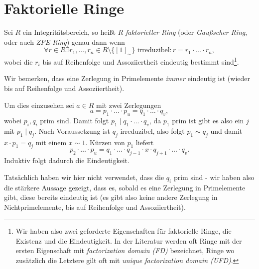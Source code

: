 
\section{Faktorielle Ringe}

\begin{definition}
    Sei $R$ ein Integritätsbereich, so heißt $R$ \emph{faktorieller Ring} (oder \emph{Gaußscher Ring}, oder auch \emph{ZPE-Ring}) genau dann wenn
    $$ \forall r \in R \exists r_1, \hdots, r_n \in R \setminus \{ [1]_\sim \} \text{ irreduzibel} : r = r_1 \cdot \hdots \cdot r_n, $$
    wobei die $r_i$ bis auf Reihenfolge und Assoziiertheit eindeutig bestimmt sind\footnote{Wir haben also zwei geforderte Eigenschaften für faktorielle Ringe, die Existenz und die Eindeutigkeit. In der Literatur werden oft Ringe mit der ersten Eigenschaft mit \emph{factorization domain (FD)} bezeichnet, Ringe wo zusätzlich die Letztere gilt oft mit \emph{unique factorization domain (UFD)}.}.
\end{definition}

\begin{remark}
    Wir bemerken, dass eine Zerlegung in Primelemente \emph{immer} eindeutig ist (wieder bis auf Reihenfolge und Assoziiertheit).

    Um dies einzusehen sei $a \in R$ mit zwei Zerlegungen
    $$ a = p_1 \cdot \hdots \cdot p_u = q_1 \cdot \hdots \cdot q_v, $$
    wobei $p_i, q_i$ prim sind. Damit folgt $p_1 \mid q_1 \cdot \hdots \cdot q_v$, da $p_1$ prim ist gibt es also ein $j$ mit $p_1 \mid q_j$. Nach Voraussetzung ist $q_j$ irreduzibel, also folgt $p_1 \sim q_j$ und damit $x \cdot p_1 = q_j$ mit einem $x \sim 1$. Kürzen von $p_1$ liefert
    $$ p_2 \cdot \hdots \cdot p_u = q_1 \cdot \hdots \cdot q_{j-1} \cdot x \cdot q_{j+1} \cdot \hdots \cdot q_v. $$
    Induktiv folgt dadurch die Eindeutigkeit.

    Tatsächlich haben wir hier nicht verwendet, dass die $q_i$ prim sind - wir haben also die stärkere Aussage gezeigt, dass es, sobald es eine Zerlegung in Primelemente gibt, diese bereits eindeutig ist (es gibt also keine andere Zerlegung in Nichtprimelemente, bis auf Reihenfolge und Assoziiertheit).
\end{remark}

